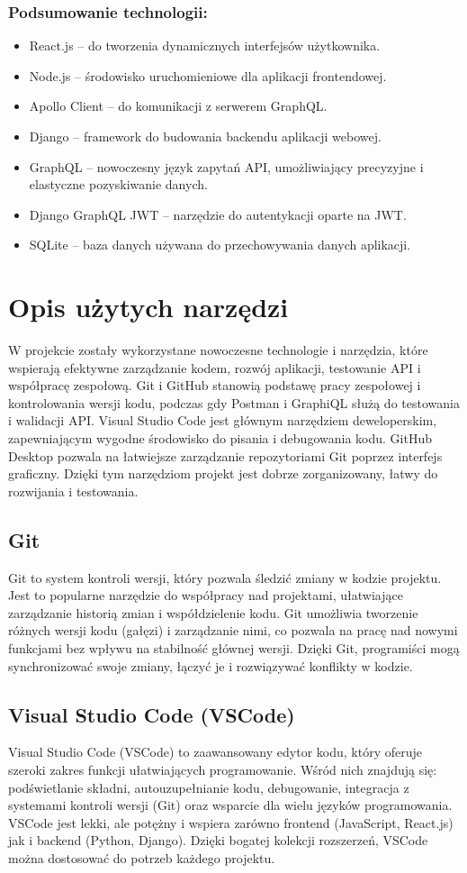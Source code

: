 \documentclass[wmii,inf,inz]{uwmthesis} %
\newenvironment{indenteditemize}
{\begin{itemize}[left=1cm]} %
{\end{itemize}}
\begin{document}
\subsubsection{Podsumowanie technologii:}
\begin{indenteditemize}
    \item React.js – do tworzenia dynamicznych interfejsów użytkownika.
    \item Node.js – środowisko uruchomieniowe dla aplikacji frontendowej.
    \item Apollo Client – do komunikacji z serwerem GraphQL.
    \item Django – framework do budowania backendu aplikacji webowej.
    \item GraphQL – nowoczesny język zapytań API, umożliwiający precyzyjne i elastyczne pozyskiwanie danych.
    \item Django GraphQL JWT – narzędzie do autentykacji oparte na JWT.
    \item SQLite – baza danych używana do przechowywania danych aplikacji.
\end{indenteditemize}
\section{Opis użytych narzędzi}
W projekcie zostały wykorzystane nowoczesne technologie i narzędzia, które wspierają efektywne zarządzanie kodem, rozwój aplikacji, testowanie API i współpracę zespołową. Git i GitHub stanowią podstawę pracy zespołowej i kontrolowania wersji kodu, podczas gdy Postman i GraphiQL służą do testowania i walidacji API. Visual Studio Code jest głównym narzędziem deweloperskim, zapewniającym wygodne środowisko do pisania i debugowania kodu. GitHub Desktop pozwala na łatwiejsze zarządzanie repozytoriami Git poprzez interfejs graficzny. Dzięki tym narzędziom projekt jest dobrze zorganizowany, łatwy do rozwijania i testowania.
\subsection{Git}
Git to system kontroli wersji, który pozwala śledzić zmiany w kodzie projektu. Jest to popularne narzędzie do współpracy nad projektami, ułatwiające zarządzanie historią zmian i współdzielenie kodu. Git umożliwia tworzenie różnych wersji kodu (gałęzi) i zarządzanie nimi, co pozwala na pracę nad nowymi funkcjami bez wpływu na stabilność głównej wersji. Dzięki Git, programiści mogą synchronizować swoje zmiany, łączyć je i rozwiązywać konflikty w kodzie.
\subsection{Visual Studio Code (VSCode)}
Visual Studio Code (VSCode) to zaawansowany edytor kodu, który oferuje szeroki zakres funkcji ułatwiających programowanie. Wśród nich znajdują się: podświetlanie składni, autouzupełnianie kodu, debugowanie, integracja z systemami kontroli wersji (Git) oraz wsparcie dla wielu języków programowania. VSCode jest lekki, ale potężny i wspiera zarówno frontend (JavaScript, React.js) jak i backend (Python, Django). Dzięki bogatej kolekcji rozszerzeń, VSCode można dostosować do potrzeb każdego projektu.
\end{document}
